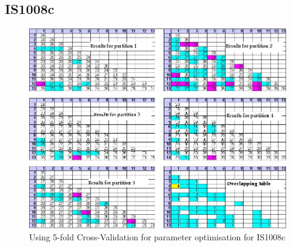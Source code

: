 \subsection{IS1008c}
\begin{figure}[hb!]
\centering
\includegraphics[scale = 0.85]{IS1008c_optimisation.jpg}
\caption{Using 5-fold Cross-Validation for parameter optimisation for IS1008c}
\label{Using 5-fold Cross-Validation for parameter optimisation for IS1008c}
\end{figure}


